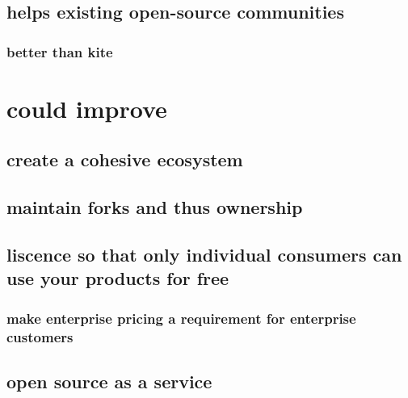 \documentclass[letterpaper]{article}
\begin{document}
\subsection{helps existing open-source communities}
\label{sec:org2204eb0}
\subsubsection{better than kite}
\label{sec:orge89dece}
\section{could improve}
\label{sec:org3f3a60c}
\subsection{create a cohesive ecosystem}
\label{sec:orgf0e1615}
\subsection{maintain forks and thus ownership}
\label{sec:orgf43e852}
\subsection{liscence so that only individual consumers can use your products for free}
\label{sec:org796de65}
\subsubsection{make enterprise pricing a requirement for enterprise customers}
\label{sec:orgbf15390}
\subsection{open source as a service}
\label{sec:orgc329d8d}
\end{document}
